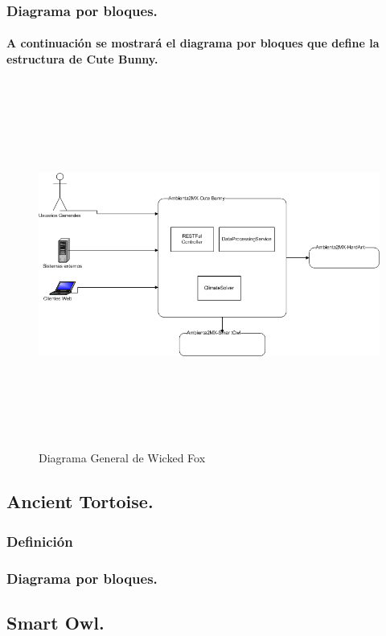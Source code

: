   	\subsubsection{Diagrama por bloques.}
  	\paragraph{A continuación se mostrará el diagrama por bloques que define la estructura de Cute Bunny.}
  	\newpage
  	\begin{landscape}
	  	\begin{figure}[h!]
	  	\centering
		  \includegraphics[width=22.5cm,height=12cm]{./images/DiagramaCuteBunny.png}
		  \caption{Diagrama General de Wicked Fox}
		\end{figure}
  	\end{landscape}
    \newpage
  \subsection{Ancient Tortoise.}
  	\subsubsection{Definición}
  	\subsubsection{Diagrama por bloques.}
  \subsection{Smart Owl.}

